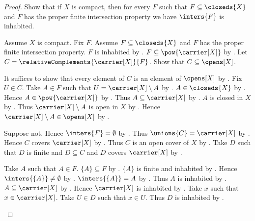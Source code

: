 \begin{proof}
    Show that if $X$ is compact, then for every $F$ such that
        $F\subseteq\closeds{X}$ and $F$ has the proper finite intersection property
        we have $\inters{F}$ is inhabited.
    \begin{subproof}
        Assume $X$ is compact.
        Fix $F$.
        Assume $F\subseteq\closeds{X}$ and
            $F$ has the proper finite intersection property.
        $F$ is inhabited by .
        $F\subseteq\pow{\carrier[X]}$
            by .
        Let $C=\relativeComplements{\carrier[X]}{F}$.
        Show that $C\subseteq\opens[X]$.
        \begin{subproof}
            It suffices to show that every element of $C$ is an element of
                $\opens[X]$ by .
            Fix $U\in C$.
            Take $A\in F$ such that $U=\carrier[X]\setminus A$
                by .
            $A\in\closeds{X}$ by .
            Hence $A\in\pow{\carrier[X]}$ by .
            Thus $A\subseteq\carrier[X]$ by .
            $A$ is closed in $X$ by .
            Thus $\carrier[X]\setminus A$ is open in $X$
                by .
            Hence $\carrier[X]\setminus A\in\opens[X]$
                by .
        \end{subproof}
        Suppose not.
        Hence $\inters{F}=\emptyset$ by .
        Thus $\unions{C}=\carrier[X]$
            by .
        Hence $C$ covers $\carrier[X]$
            by .
        Thus $C$ is an open cover of $X$ by .
        Take $D$ such that $D$ is finite and $D\subseteq C$ and
            $D$ covers $\carrier[X]$ by .

        Take $A$ such that $A\in F$.
        $\{A\}\subseteq F$ by .
        $\{A\}$ is finite and inhabited
            by .
        Hence $\inters{\{A\}}\neq\emptyset$
            by .
        $\inters{\{A\}}=A$ by .
        Thus $A$ is inhabited by .
        $A\subseteq\carrier[X]$ by .
        Hence $\carrier[X]$ is inhabited by .
        Take $x$ such that $x\in\carrier[X]$.
        Take $U\in D$ such that $x\in U$.
        Thus $D$ is inhabited by \auto.


\end{subproof}
\end{proof}
